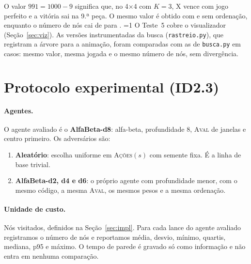 \documentclass[11pt,a4paper]{article}
\newcommand{\fn}[1]{\textsc{#1}}            %
\newcommand{\arq}[1]{\texttt{#1}}
\begin{document}
O valor $991 = 1000 - 9$ significa que, no 4×4 com $K=3$, X vence com jogo perfeito e a vitória sai na 9.ª peça.
O mesmo valor é obtido com e sem ordenação, enquanto o número de nós cai de  para
.
\ifnum{}=1
O Teste~5 cobre o visualizador (Seção~\ref{sec:viz}). As versões instrumentadas da busca (\arq{rastreio.py}),
que registram a árvore para a animação, foram comparadas com as de \arq{busca.py} em  casos:
mesmo valor, mesma jogada e o mesmo número de nós, sem divergência.
\fi

\section{Protocolo experimental (ID2.3)}
\label{sec:protocolo}

\paragraph{Agentes.} O agente avaliado é o \textbf{AlfaBeta-d8}: alfa-beta, profundidade 8, \fn{Aval} de janelas e
centro primeiro. Os adversários são:
\begin{enumerate}
  \item \textbf{Aleatório}: escolha uniforme em \fn{Ações}$(s)$ com semente fixa. É a linha de base trivial.
  \item \textbf{AlfaBeta-d2, d4 e d6}: o próprio agente com profundidade menor, com o mesmo código, a mesma
        \fn{Aval}, os mesmos pesos e a mesma ordenação.
\end{enumerate}

\paragraph{Unidade de custo.} Nós visitados, definidos na Seção~\ref{sec:impl}. Para cada lance do agente
avaliado registramos o número de nós e reportamos média, desvio, mínimo, quartis, mediana, p95 e máximo. O tempo
de parede é gravado só como informação e não entra em nenhuma comparação.
\end{document}
